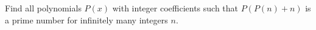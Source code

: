 Find all polynomials $P(x)$ with integer coefficients such that $P(P(n) + n)$ is a prime number for infinitely many integers $n$.
